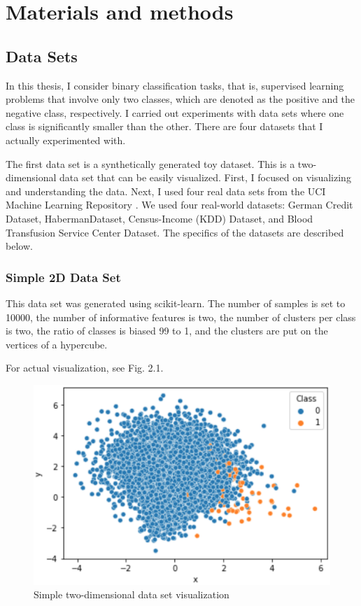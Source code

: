 \chapter{Materials and methods}
\section{Data Sets}

In this thesis, I consider binary classification tasks, that is, supervised learning problems that involve only two classes, which are denoted as the positive and the negative class, respectively. I carried out experiments with data sets where one class is significantly smaller than the other. There are four datasets that I actually experimented with. 

The first data set is a synthetically generated toy dataset. This is a two-dimensional data set that can be easily visualized. First, I focused on visualizing and understanding the data. Next, I used four real data sets from the UCI Machine Learning Repository \cite{UCI}. We used four real-world datasets: German Credit Dataset, HabermanDataset, Census-Income (KDD) Dataset, and Blood Transfusion Service Center Dataset. The specifics of the datasets are described below.

\subsection{Simple 2D Data Set}
This data set was generated using scikit-learn.
The number of samples is set to 10000, the number of informative features is two,
the number of clusters per class is two, the ratio of classes is biased 99 to 1, and the clusters are put on the vertices of a hypercube.

For actual visualization, see Fig. 2.1.
\begin{center}
    \begin{figure}[ht]
        \caption{Simple two-dimensional data set visualization}
        \label{tab:team-rating-features}
        \begin{center}
            \includegraphics[scale=0.8]{image/data1.eps}
        \end{center}
    \end{figure}
\end{center}




